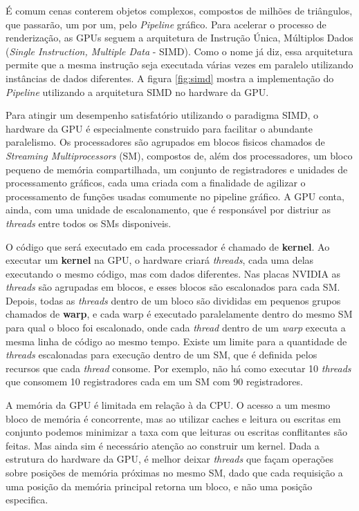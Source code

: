     É comum cenas conterem objetos complexos, compostos de milhões de triângulos, que passarão, um por um, pelo
\textit{Pipeline} gráfico. Para acelerar o processo de renderização, as GPUs seguem a arquitetura de Instrução Única,
Múltiplos Dados (\textit{Single Instruction, Multiple Data} - SIMD). Como o nome já diz, essa arquitetura permite que
a mesma instrução seja executada várias vezes em paralelo utilizando instâncias de dados diferentes. A figura
\ref{fig:simd} mostra a implementação do \textit{Pipeline} utilizando a arquitetura SIMD no hardware da GPU.

  Para atingir um desempenho satisfatório utilizando o paradigma SIMD, o hardware
da GPU é especialmente construido para facilitar o abundante paralelismo. Os
processadores são agrupados em blocos fisicos chamados de \textit{Streaming Multiprocessors} (SM),
compostos de, além dos processadores, um bloco pequeno de memória compartilhada,
um conjunto de registradores e unidades de processamento gráficos, cada uma criada
com a finalidade de agilizar o processamento de funções usadas comumente no pipeline
gráfico. A GPU conta, ainda, com uma unidade de escalonamento, que é responsável
por distriur as \textit{threads} entre todos os SMs disponiveis.

    O código que será executado em cada processador é chamado de \textbf{kernel}. Ao executar um \textbf{kernel} na GPU, o
hardware criará \textit{threads}, cada uma delas executando o mesmo código, mas com dados diferentes. Nas placas NVIDIA as \textit{threads}
são agrupadas em blocos, e esses blocos são escalonados para cada SM. Depois, todas as \textit{threads} dentro de um bloco são
divididas em pequenos grupos chamados de \textbf{warp}, e cada warp é executado paralelamente dentro do
mesmo SM para qual o bloco foi escalonado, onde cada \textit{thread} dentro de um \textit{warp} executa a mesma linha de código ao mesmo tempo.
Existe um limite para a quantidade de \textit{threads} escalonadas para execução
dentro de um SM, que é definida pelos recursos que cada \textit{thread} consome. Por exemplo, não há como executar 10 \textit{threads}
que consomem 10 registradores cada em um SM com 90 registradores.

    A memória da GPU é limitada em relação à da CPU. O acesso a um mesmo bloco de memória é concorrente, mas ao utilizar caches e leitura
ou escritas em conjunto podemos minimizar a taxa com que leituras ou escritas conflitantes são feitas. Mas ainda sim é
necessário atenção ao construir um kernel. Dada a estrutura do hardware da GPU, é melhor deixar \textit{threads} que façam
operações sobre posições de memória próximas no mesmo SM, dado que cada requisição
a uma posição da memória principal retorna um bloco, e não uma posição especifica.

